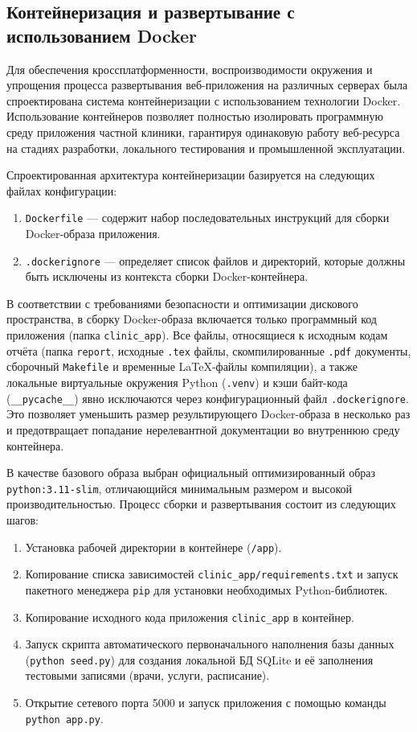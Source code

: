 \subsection{Контейнеризация и развертывание с использованием Docker}

Для обеспечения кроссплатформенности, воспроизводимости окружения и упрощения процесса развертывания веб-приложения на различных серверах была спроектирована система контейнеризации с использованием технологии Docker. Использование контейнеров позволяет полностью изолировать программную среду приложения частной клиники, гарантируя одинаковую работу веб-ресурса на стадиях разработки, локального тестирования и промышленной эксплуатации.

Спроектированная архитектура контейнеризации базируется на следующих файлах конфигурации:
\begin{enumerate}
\item \texttt{Dockerfile} --- содержит набор последовательных инструкций для сборки Docker-образа приложения.
\item \texttt{.dockerignore} --- определяет список файлов и директорий, которые должны быть исключены из контекста сборки Docker-контейнера.
\end{enumerate}

В соответствии с требованиями безопасности и оптимизации дискового пространства, в сборку Docker-образа включается только программный код приложения (папка \texttt{clinic\_app}). Все файлы, относящиеся к исходным кодам отчёта (папка \texttt{report}, исходные \texttt{.tex} файлы, скомпилированные \texttt{.pdf} документы, сборочный \texttt{Makefile} и временные LaTeX-файлы компиляции), а также локальные виртуальные окружения Python (\texttt{.venv}) и кэши байт-кода (\texttt{\_\_pycache\_\_}) явно исключаются через конфигурационный файл \texttt{.dockerignore}. Это позволяет уменьшить размер результирующего Docker-образа в несколько раз и предотвращает попадание нерелевантной документации во внутреннюю среду контейнера.

В качестве базового образа выбран официальный оптимизированный образ \texttt{python:3.11-slim}, отличающийся минимальным размером и высокой производительностью. Процесс сборки и развертывания состоит из следующих шагов:
\begin{enumerate}
\item Установка рабочей директории в контейнере (\texttt{/app}).
\item Копирование списка зависимостей \texttt{clinic\_app/requirements.txt} и запуск пакетного менеджера \texttt{pip} для установки необходимых Python-библиотек.
\item Копирование исходного кода приложения \texttt{clinic\_app} в контейнер.
\item Запуск скрипта автоматического первоначального наполнения базы данных (\texttt{python seed.py}) для создания локальной БД SQLite и её заполнения тестовыми записями (врачи, услуги, расписание).
\item Открытие сетевого порта 5000 и запуск приложения с помощью команды \texttt{python app.py}.
\end{enumerate}

